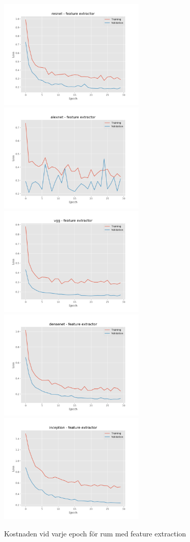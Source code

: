 \documentclass[]{kththesis}
\begin{document}
\begin{figure}[h]
  \includegraphics[width=7cm]{r_l_resnet_fe}
  \includegraphics[width=7cm]{r_l_alexnet_fe}
  \includegraphics[width=7cm]{r_l_vgg_fe}
  \includegraphics[width=7cm]{r_l_densenet_fe}
  \includegraphics[width=7cm]{r_l_inception_fe}
  \caption{Kostnaden vid varje epoch för rum med feature extraction}
  \label{fig:r_l_1}
\end{figure}
\end{document}
